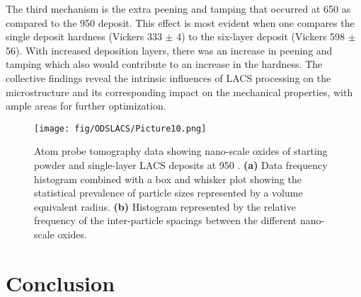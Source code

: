 	The third mechanism is the extra peening and tamping that occurred at 650 \celsius{} as compared to the 950 \celsius{} deposit. This effect is most evident when one compares the single deposit hardness (Vickers 333 $ \pm $  4) to the six-layer deposit (Vickers 598 $ \pm $  56). With increased deposition layers, there was an increase in peening and tamping which also would contribute to an increase in the hardness. The collective findings reveal the intrinsic influences of LACS processing on the microstructure and its corresponding impact on the mechanical properties, with ample areas for further optimization.



			\begin{figure}
				\centering
				\texttt{[image: fig/ODSLACS/Picture10.png]}
				\caption[Atom probe tomography data showing nano-scale oxides of starting powder and single-layer LACS deposits at 950 \celsius{} \cite{RN383}.]{Atom probe tomography data showing nano-scale oxides of starting powder and single-layer LACS deposits at 950 \celsius{} \cite{RN383}. \textbf{(a) }Data frequency histogram combined with a box and whisker plot showing the statistical prevalence of particle sizes represented by a volume equivalent radius. \textbf{(b)} Histogram represented by the relative frequency of the inter-particle spacings between the different nano-scale oxides.}
				\label{fig:ODSLACS10}
			\end{figure}




	\section*{Conclusion}



